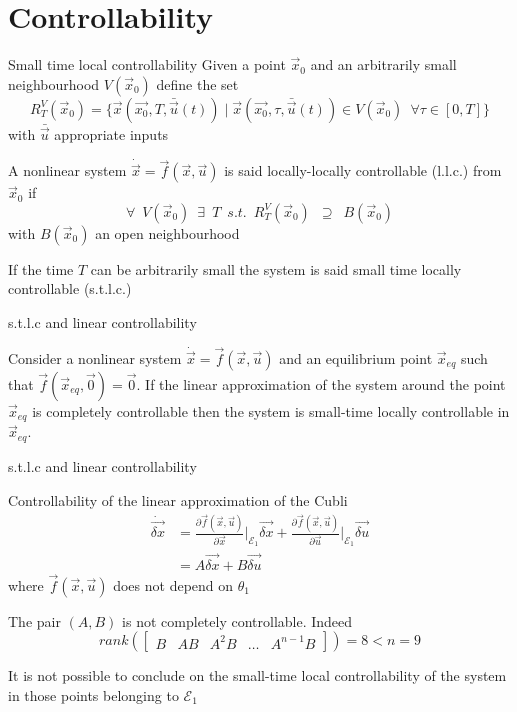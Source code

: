 \section{Controllability}

\begin{frame}{Small time local controllability \theory}
  Given a point $\vec{x}_0$ and an arbitrarily small neighbourhood $V(\vec{x}_0)$ define the set
  \[
  R_{T}^{V}(\vec{x}_0) = \{\vec{x}(\vec{x_0}, T, \bar{\vec{u}}(t)) \mid
  \vec{x}(\vec{x_0}, \tau, \bar{\vec{u}}(t)) \in V(\vec{x}_0) \enspace \forall \tau \in [0,T]\}
  \]
  with $\bar{\vec{u}}$ appropriate inputs
  \par
  A nonlinear system $\dot{\vec{x}} = \vec{f}(\vec{x}, \vec{u})$ is said \alert{locally-locally controllable} (l.l.c.) from $\vec{x}_0$ if
  \[
  \forall \enspace V(\vec{x}_0) \enspace \exists  \enspace T \enspace
  s.t. \enspace R_{T}^{V}(\vec{x}_0) \enspace \supseteq \enspace B(\vec{x}_0)
  \]
  with $B(\vec{x}_0)$ an open neighbourhood
  \par
  If the time $T$ can be arbitrarily small the system is said \alert{small time locally controllable} (s.t.l.c.)
\end{frame}

\begin{frame}{s.t.l.c and linear controllability \theory}
  \begin{theorem}
    Consider a nonlinear system $\dot{\vec{x}} = \vec{f}(\vec{x}, \vec{u})$ and an equilibrium point $\vec{x}_{eq}$
    such that $\vec{f}(\vec{x}_{eq}, \vec{0}) = \vec{0}$. If the linear approximation of the system around
    the point $\vec{x}_{eq}$ is completely controllable then the system is small-time locally controllable
    in $\vec{x}_{eq}$.
  \end{theorem}
\end{frame}

\begin{frame}{s.t.l.c and linear controllability \cubli}
  \begin{exampleblock}{Controllability of the linear approximation of the Cubli}
  \[
  \begin{split}
    \dot{\vec{\delta x}} &= \frac{\partial{\vec{f}(\vec{x},\vec{u})}}{\partial{\vec{x}}}\Big|_{\mathcal{E}_1} \vec{\delta x} +
    \frac{\partial{\vec{f}(\vec{x},\vec{u})}}{\partial{\vec{u}}}\Big|_{\mathcal{E}_1} \vec{\delta u}\\
    &= A \vec{\delta x} + B \vec{\delta u}
  \end{split}
  \]
  where $\vec{f}(\vec{x},\vec{u})$ does \alert{not} depend on $\theta_1$
  \par
  The pair $(A, B)$ is \alert{not} completely controllable. Indeed
  \[
  rank\left(
  \begin{bmatrix}
    B & AB & A^2B & \dots & A^{n-1}B
  \end{bmatrix}
  \right) = 8 < n = 9
  \]
  \end{exampleblock}
  It is \alert{not possible to conclude} on the small-time local controllability of the system
  in those points belonging to $\mathcal{E}_1$
\end{frame}

